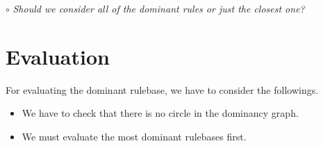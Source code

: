\documentclass[a4paper,12pt]{article}
\newenvironment{question}[1]
{\noindent\textcolor{OliveGreen}{$\circ$ \textit{#1}}

\smallskip

\color{Gray}

}{\bigskip}
\begin{document}
\begin{question}{Should we consider all of the dominant rules or just the closest one?}
\end{question}

\section{Evaluation}

For evaluating the dominant rulebase, we have to consider the followings.
\begin{itemize}
\item We have to check that there is no circle in the dominancy graph.
\item We must evaluate the most dominant rulebases first.
\end{itemize}
\end{document}
